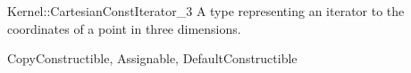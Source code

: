\begin{ccRefConcept}{Kernel::CartesianConstIterator_3}
A type representing an iterator to the  coordinates of a point
in three dimensions.

\ccRefines
CopyConstructible, Assignable, DefaultConstructible

\ccSeeAlso
{} \\

\end{ccRefConcept}
